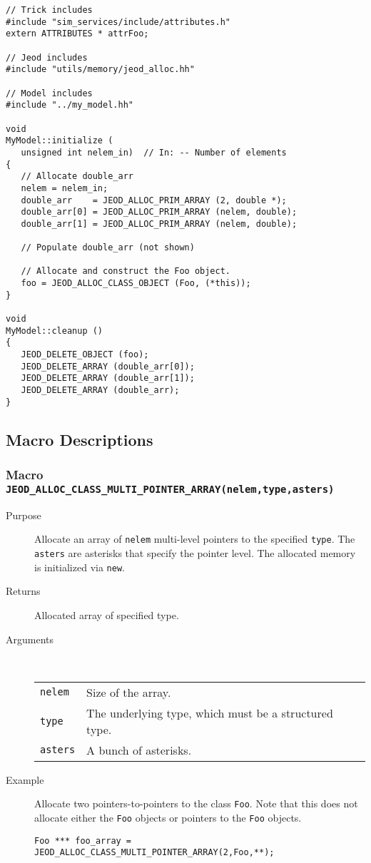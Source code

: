 \begin{verbatim}
// Trick includes
#include "sim_services/include/attributes.h"
extern ATTRIBUTES * attrFoo;

// Jeod includes
#include "utils/memory/jeod_alloc.hh"

// Model includes
#include "../my_model.hh"

void
MyModel::initialize (
   unsigned int nelem_in)  // In: -- Number of elements
{
   // Allocate double_arr
   nelem = nelem_in;
   double_arr    = JEOD_ALLOC_PRIM_ARRAY (2, double *);
   double_arr[0] = JEOD_ALLOC_PRIM_ARRAY (nelem, double);
   double_arr[1] = JEOD_ALLOC_PRIM_ARRAY (nelem, double);

   // Populate double_arr (not shown)

   // Allocate and construct the Foo object.
   foo = JEOD_ALLOC_CLASS_OBJECT (Foo, (*this));
}

void
MyModel::cleanup ()
{
   JEOD_DELETE_OBJECT (foo);
   JEOD_DELETE_ARRAY (double_arr[0]);
   JEOD_DELETE_ARRAY (double_arr[1]);
   JEOD_DELETE_ARRAY (double_arr);
}
\end{verbatim}

\subsection{Macro Descriptions}

\subsubsection{Macro {\tt JEOD\_ALLOC\_CLASS\_MULTI\_POINTER\_ARRAY(nelem,type,asters)}}
\begin{description}
\item[Purpose]
Allocate an array of {\tt nelem} multi-level pointers to the specified
{\tt type}. The {\tt asters} are asterisks that specify the pointer level.
The allocated memory is initialized via {\tt new}.
\item[Returns]
Allocated array of specified type.
\item[Arguments] \ \\
\begin{tabular}{@{}ll}
{\tt nelem} &  Size of the array. \\
{\tt type} &  The underlying type, which must be a structured type. \\
{\tt asters} &  A bunch of asterisks. \\
\end{tabular}
\item[Example]
Allocate two pointers-to-pointers to the class {\tt Foo}.
Note that this does not allocate either the {\tt Foo} objects or pointers to
the {\tt Foo} objects.
\begin{verbatim}
Foo *** foo_array = JEOD_ALLOC_CLASS_MULTI_POINTER_ARRAY(2,Foo,**);
\end{verbatim}
\end{description}

